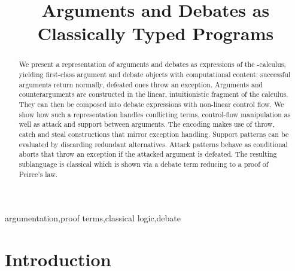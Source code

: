 \documentclass{IOS-Book-Article}
\begin{document}
\pagestyle{empty}
\begin{frontmatter}

\title{Arguments and Debates as Classically Typed Programs}

\author[A]{ }
\address[A]{FAU Erlangen-Nuremberg}

\begin{abstract}
  We present a representation of arguments and debates as expressions of the \matilda-calculus, yielding first-class argument and debate objects with computational content: successful arguments return normally, defeated ones throw an exception. Arguments and counterarguments are constructed in the linear, intuitionistic fragment of the calculus. They can then be composed into debate expressions with non-linear control flow. We show how such a representation handles conflicting terms, control-flow manipulation as well as attack and support between arguments. The encoding makes use of throw, catch and steal constructions that mirror exception handling. Support patterns can be evaluated by discarding redundant alternatives. Attack patterns behave as conditional aborts that throw an exception if the attacked argument is defeated. The resulting \ACDC sublanguage is classical which is shown via a debate term reducing to a proof of Peirce's law.
\end{abstract}

\begin{keyword}
argumentation\sep proof terms\sep classical logic\sep debate 
\end{keyword}

\end{frontmatter}

\section{Introduction}\label{sec:introduction}
\end{document}
